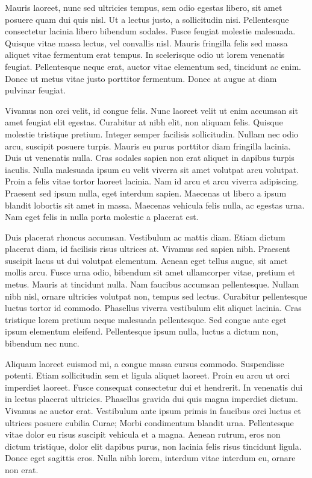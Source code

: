 Mauris laoreet, nunc sed ultricies tempus, sem odio egestas libero, sit amet posuere quam dui quis nisl. Ut a lectus justo, a sollicitudin nisi. Pellentesque consectetur lacinia libero bibendum sodales. Fusce feugiat molestie malesuada. Quisque vitae massa lectus, vel convallis nisl. Mauris fringilla felis sed massa aliquet vitae fermentum erat tempus. In scelerisque odio ut lorem venenatis feugiat. Pellentesque neque erat, auctor vitae elementum sed, tincidunt ac enim. Donec ut metus vitae justo porttitor fermentum. Donec at augue at diam pulvinar feugiat.

Vivamus non orci velit, id congue felis. Nunc laoreet velit ut enim accumsan sit amet feugiat elit egestas. Curabitur at nibh elit, non aliquam felis. Quisque molestie tristique pretium. Integer semper facilisis sollicitudin. Nullam nec odio arcu, suscipit posuere turpis. Mauris eu purus porttitor diam fringilla lacinia. Duis ut venenatis nulla. Cras sodales sapien non erat aliquet in dapibus turpis iaculis. Nulla malesuada ipsum eu velit viverra sit amet volutpat arcu volutpat. Proin a felis vitae tortor laoreet lacinia. Nam id arcu et arcu viverra adipiscing. Praesent sed ipsum nulla, eget interdum sapien. Maecenas ut libero a ipsum blandit lobortis sit amet in massa. Maecenas vehicula felis nulla, ac egestas urna. Nam eget felis in nulla porta molestie a placerat est.

Duis placerat rhoncus accumsan. Vestibulum ac mattis diam. Etiam dictum placerat diam, id facilisis risus ultrices at. Vivamus sed sapien nibh. Praesent suscipit lacus ut dui volutpat elementum. Aenean eget tellus augue, sit amet mollis arcu. Fusce urna odio, bibendum sit amet ullamcorper vitae, pretium et metus. Mauris at tincidunt nulla. Nam faucibus accumsan pellentesque. Nullam nibh nisl, ornare ultricies volutpat non, tempus sed lectus. Curabitur pellentesque luctus tortor id commodo. Phasellus viverra vestibulum elit aliquet lacinia. Cras tristique lorem pretium neque malesuada pellentesque. Sed congue ante eget ipsum elementum eleifend. Pellentesque ipsum nulla, luctus a dictum non, bibendum nec nunc.

Aliquam laoreet euismod mi, a congue massa cursus commodo. Suspendisse potenti. Etiam sollicitudin sem et ligula aliquet laoreet. Proin eu arcu ut orci imperdiet laoreet. Fusce consequat consectetur dui et hendrerit. In venenatis dui in lectus placerat ultricies. Phasellus gravida dui quis magna imperdiet dictum. Vivamus ac auctor erat. Vestibulum ante ipsum primis in faucibus orci luctus et ultrices posuere cubilia Curae; Morbi condimentum blandit urna. Pellentesque vitae dolor eu risus suscipit vehicula et a magna. Aenean rutrum, eros non dictum tristique, dolor elit dapibus purus, non lacinia felis risus tincidunt ligula. Donec eget sagittis eros. Nulla nibh lorem, interdum vitae interdum eu, ornare non erat.

